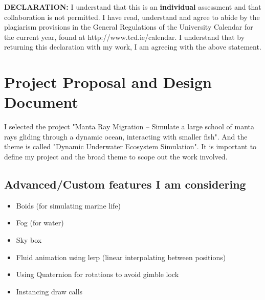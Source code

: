 \documentclass[a4paper, 10pt]{article}
\begin{document}

\begin{tcolorbox}[colback=light-blue]
\begin{small}
\textbf{DECLARATION:} I understand that this is an \textbf{individual} assessment and that collaboration is not permitted. I have read, understand and agree to abide by the plagiarism provisions in the
General Regulations of the University Calendar for the
current year, found at http://www.tcd.ie/calendar.
I understand that by returning this declaration with my work, I am agreeing with the above statement. 
\end{small}
\end{tcolorbox}

\bigskip



\section{Project Proposal and Design Document}
I selected the project "Manta Ray Migration – Simulate a large school of manta rays gliding through a dynamic ocean, interacting with smaller fish".
And the theme is called "Dynamic Underwater Ecosystem Simulation". It is important to define my project and the broad theme to scope out the work involved.

\subsection{Advanced/Custom features I am considering}
\begin{itemize}
    \item Boids (for simulating marine life)
    \item Fog (for water)
    \item Sky box
    \item Fluid animation using lerp (linear interpolating between positions)
    \item Using Quaternion for rotations to avoid gimble lock
    \item Instancing draw calls
\end{itemize}
\end{document}
